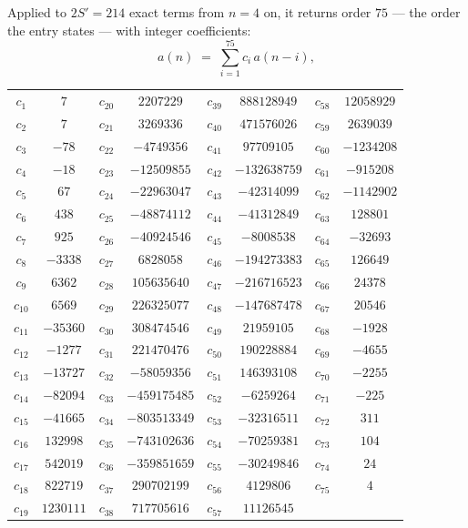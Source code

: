 \documentclass[11pt,a4paper]{article}
\theoremstyle{plain}
\theoremstyle{definition}
\begin{document}
Applied to $2S'=214$ exact terms from $n=4$ on, it returns order $75$ --- the
order the entry states --- with integer coefficients:
\[
a(n)\;=\;\sum_{i=1}^{75}c_i\,a(n-i),
\]
\begin{center}\small
\begin{tabular}{cccccccc}
$c_{1}$ & $7$ & $c_{20}$ & $2207229$ & $c_{39}$ & $888128949$ & $c_{58}$ & $12058929$ \\
$c_{2}$ & $7$ & $c_{21}$ & $3269336$ & $c_{40}$ & $471576026$ & $c_{59}$ & $2639039$ \\
$c_{3}$ & $-78$ & $c_{22}$ & $-4749356$ & $c_{41}$ & $97709105$ & $c_{60}$ & $-1234208$ \\
$c_{4}$ & $-18$ & $c_{23}$ & $-12509855$ & $c_{42}$ & $-132638759$ & $c_{61}$ & $-915208$ \\
$c_{5}$ & $67$ & $c_{24}$ & $-22963047$ & $c_{43}$ & $-42314099$ & $c_{62}$ & $-1142902$ \\
$c_{6}$ & $438$ & $c_{25}$ & $-48874112$ & $c_{44}$ & $-41312849$ & $c_{63}$ & $128801$ \\
$c_{7}$ & $925$ & $c_{26}$ & $-40924546$ & $c_{45}$ & $-8008538$ & $c_{64}$ & $-32693$ \\
$c_{8}$ & $-3338$ & $c_{27}$ & $6828058$ & $c_{46}$ & $-194273383$ & $c_{65}$ & $126649$ \\
$c_{9}$ & $6362$ & $c_{28}$ & $105635640$ & $c_{47}$ & $-216716523$ & $c_{66}$ & $24378$ \\
$c_{10}$ & $6569$ & $c_{29}$ & $226325077$ & $c_{48}$ & $-147687478$ & $c_{67}$ & $20546$ \\
$c_{11}$ & $-35360$ & $c_{30}$ & $308474546$ & $c_{49}$ & $21959105$ & $c_{68}$ & $-1928$ \\
$c_{12}$ & $-1277$ & $c_{31}$ & $221470476$ & $c_{50}$ & $190228884$ & $c_{69}$ & $-4655$ \\
$c_{13}$ & $-13727$ & $c_{32}$ & $-58059356$ & $c_{51}$ & $146393108$ & $c_{70}$ & $-2255$ \\
$c_{14}$ & $-82094$ & $c_{33}$ & $-459175485$ & $c_{52}$ & $-6259264$ & $c_{71}$ & $-225$ \\
$c_{15}$ & $-41665$ & $c_{34}$ & $-803513349$ & $c_{53}$ & $-32316511$ & $c_{72}$ & $311$ \\
$c_{16}$ & $132998$ & $c_{35}$ & $-743102636$ & $c_{54}$ & $-70259381$ & $c_{73}$ & $104$ \\
$c_{17}$ & $542019$ & $c_{36}$ & $-359851659$ & $c_{55}$ & $-30249846$ & $c_{74}$ & $24$ \\
$c_{18}$ & $822719$ & $c_{37}$ & $290702199$ & $c_{56}$ & $4129806$ & $c_{75}$ & $4$ \\
$c_{19}$ & $1230111$ & $c_{38}$ & $717705616$ & $c_{57}$ & $11126545$ &  &  \\
\end{tabular}
\end{center}
\end{document}
